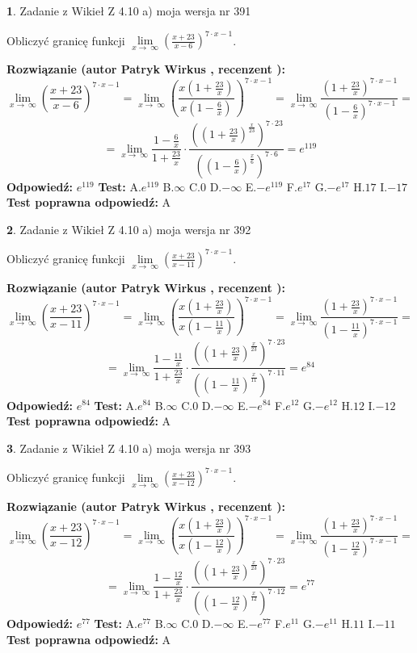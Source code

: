 \documentclass[12pt, a4paper]{article}
\theoremstyle{definition} %
\newtheorem{zad}{}
\newcommand{\zadStart}[1]{\begin{zad}#1\newline}
\newcommand{\zadStop}{\end{zad}}
\newcommand{\rozwStart}[2]{\noindent \textbf{Rozwiązanie (autor #1 , recenzent #2): }\newline}
\newcommand{\rozwStop}{\newline}
\newcommand{\odpStart}{\noindent \textbf{Odpowiedź:}\newline}
\newcommand{\odpStop}{\newline}
\newcommand{\testStart}{\noindent \textbf{Test:}\newline}
\newcommand{\testStop}{\newline}
\newcommand{\kluczStart}{\noindent \textbf{Test poprawna odpowiedź:}\newline}
\newcommand{\kluczStop}{\newline}
\begin{document}
\zadStart{Zadanie z Wikieł Z 4.10 a) moja wersja nr 391}

Obliczyć granicę funkcji  $\lim\limits_{x\to\ \infty}(\frac{x+23}{x-6})^{7\cdot x-1}$.
\zadStop
\rozwStart{Patryk Wirkus}{}
$$\lim\limits_{x\to\ \infty}(\frac{x+23}{x-6})^{7\cdot x-1} = \lim\limits_{x\to\ \infty}(\frac{x(1+\frac{23}{x})}{x(1-\frac{6}{x})})^{7\cdot x-1}=\lim\limits_{x\to\ \infty}\frac{(1+\frac{23}{x})^{7\cdot x-1}}{(1-\frac{6}{x})^{7\cdot x-1}}=$$
$$=\lim\limits_{x\to\ \infty}\frac{1-\frac{6}{x}}{1+\frac{23}{x}}\cdot\frac{((1+\frac{23}{x})^{\frac{x}{23}})^{7\cdot23}}{((1-\frac{6}{x})^{\frac{x}{6}})^{7\cdot6}}=e^{119}$$
\rozwStop
\odpStart
$e^{119}$
\odpStop
\testStart
A.$e^{119}$ B.$\infty$ C.$0$ D.$-\infty$ E.$-e^{119}$
F.$e^{17}$ G.$-e^{17}$
H.$17$
I.$-17$
\testStop
\kluczStart
A
\kluczStop



\zadStart{Zadanie z Wikieł Z 4.10 a) moja wersja nr 392}

Obliczyć granicę funkcji  $\lim\limits_{x\to\ \infty}(\frac{x+23}{x-11})^{7\cdot x-1}$.
\zadStop
\rozwStart{Patryk Wirkus}{}
$$\lim\limits_{x\to\ \infty}(\frac{x+23}{x-11})^{7\cdot x-1} = \lim\limits_{x\to\ \infty}(\frac{x(1+\frac{23}{x})}{x(1-\frac{11}{x})})^{7\cdot x-1}=\lim\limits_{x\to\ \infty}\frac{(1+\frac{23}{x})^{7\cdot x-1}}{(1-\frac{11}{x})^{7\cdot x-1}}=$$
$$=\lim\limits_{x\to\ \infty}\frac{1-\frac{11}{x}}{1+\frac{23}{x}}\cdot\frac{((1+\frac{23}{x})^{\frac{x}{23}})^{7\cdot23}}{((1-\frac{11}{x})^{\frac{x}{11}})^{7\cdot11}}=e^{84}$$
\rozwStop
\odpStart
$e^{84}$
\odpStop
\testStart
A.$e^{84}$ B.$\infty$ C.$0$ D.$-\infty$ E.$-e^{84}$
F.$e^{12}$ G.$-e^{12}$
H.$12$
I.$-12$
\testStop
\kluczStart
A
\kluczStop



\zadStart{Zadanie z Wikieł Z 4.10 a) moja wersja nr 393}

Obliczyć granicę funkcji  $\lim\limits_{x\to\ \infty}(\frac{x+23}{x-12})^{7\cdot x-1}$.
\zadStop
\rozwStart{Patryk Wirkus}{}
$$\lim\limits_{x\to\ \infty}(\frac{x+23}{x-12})^{7\cdot x-1} = \lim\limits_{x\to\ \infty}(\frac{x(1+\frac{23}{x})}{x(1-\frac{12}{x})})^{7\cdot x-1}=\lim\limits_{x\to\ \infty}\frac{(1+\frac{23}{x})^{7\cdot x-1}}{(1-\frac{12}{x})^{7\cdot x-1}}=$$
$$=\lim\limits_{x\to\ \infty}\frac{1-\frac{12}{x}}{1+\frac{23}{x}}\cdot\frac{((1+\frac{23}{x})^{\frac{x}{23}})^{7\cdot23}}{((1-\frac{12}{x})^{\frac{x}{12}})^{7\cdot12}}=e^{77}$$
\rozwStop
\odpStart
$e^{77}$
\odpStop
\testStart
A.$e^{77}$ B.$\infty$ C.$0$ D.$-\infty$ E.$-e^{77}$
F.$e^{11}$ G.$-e^{11}$
H.$11$
I.$-11$
\testStop
\kluczStart
A
\kluczStop
\end{document}
